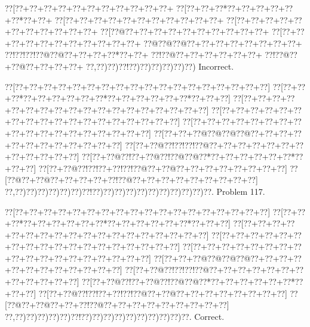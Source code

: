 \documentclass[a5paper]{article}
\begin{document}
\begin{center}
{\goo
\0??[\0??+\0??+\0??+\0??+\0??+\0??+\0??+\0??+\0??+\0??+\0??+
\0??[\0??+\0??+\0??*\0??+\0??+\0??+\0??+\0??+\0??*\0??+\0??+
\0??[\0??+\0??+\0??+\0??+\0??+\0??+\0??+\0??+\0??+\0??+\0??+
\0??[\0??+\0??+\0??+\0??+\0??+\0??+\0??+\0??+\0??+\0??+\0??+
\0??[\0??@\0??+\0??+\0??+\0??+\0??+\0??+\0??+\0??+\0??+\0??+
\0??[\0??+\0??+\0??+\0??+\0??+\0??+\0??+\0??+\0??+\0??+\0??+
\0??@\0??@\0??@\0??+\0??+\0??+\0??+\0??+\0??+\0??+\0??+
\0??!\0??!\0??!\0??@\0??@\0??+\0??+\0??+\0??*\0??+\0??+
\0??!\0??@\0??+\0??+\0??+\0??+\0??+\0??+
\0??!\0??@\0??+\0??@\0??+\0??+\0??+\0??+
\0??,\0??)\0??)\0??!\0??)\0??)\0??)\0??)\0??)\0??)
}
Incorrect. 

\end{center}
\newpage
\begin{center}
{\goo
\0??[\0??+\0??+\0??+\0??+\0??+\0??+\0??+\0??+\0??+\0??+\0??+\0??+\0??+\0??+\0??+\0??+\0??+\0??]
\0??[\0??+\0??+\0??*\0??+\0??+\0??+\0??+\0??+\0??*\0??+\0??+\0??+\0??+\0??+\0??*\0??+\0??+\0??]
\0??[\0??+\0??+\0??+\0??+\0??+\0??+\0??+\0??+\0??+\0??+\0??+\0??+\0??+\0??+\0??+\0??+\0??+\0??]
\0??[\0??+\0??+\0??+\0??+\0??+\0??+\0??+\0??+\0??+\0??+\0??+\0??+\0??+\0??+\0??+\0??+\0??+\0??]
\0??[\0??+\0??+\0??+\0??+\0??+\0??+\0??+\0??+\0??+\0??+\0??+\0??+\0??+\0??+\0??+\0??+\0??+\0??]
\0??[\0??+\0??+\0??@\0??@\0??@\0??@\0??+\0??+\0??+\0??+\0??+\0??+\0??+\0??+\0??+\0??+\0??+\0??]
\0??[\0??+\0??@\0??!\0??!\0??!\0??@\0??+\0??+\0??+\0??+\0??+\0??+\0??+\0??+\0??+\0??+\0??+\0??]
\0??[\0??+\0??@\0??!\0??+\0??@\0??!\0??@\0??@\0??*\0??+\0??+\0??+\0??+\0??+\0??*\0??+\0??+\0??]
\0??[\0??+\0??@\0??!\0??!\0??+\0??!\0??!\0??@\0??+\0??@\0??+\0??+\0??+\0??+\0??+\0??+\0??+\0??]
\0??[\0??@\0??+\0??@\0??+\0??+\0??+\0??+\0??!\0??@\0??+\0??+\0??+\0??+\0??+\0??+\0??+\0??+\0??]
\0??,\0??)\0??)\0??)\0??)\0??)\0??)\0??!\0??)\0??)\0??)\0??)\0??)\0??)\0??)\0??)\0??)\0??)\0??.
}
Problem 117.

\end{center}
\begin{center}
{\goo
\0??[\0??+\0??+\0??+\0??+\0??+\0??+\0??+\0??+\0??+\0??+\0??+\0??+\0??+\0??+\0??+\0??+\0??+\0??]
\0??[\0??+\0??+\0??*\0??+\0??+\0??+\0??+\0??+\0??*\0??+\0??+\0??+\0??+\0??+\0??*\0??+\0??+\0??]
\0??[\0??+\0??+\0??+\0??+\0??+\0??+\0??+\0??+\0??+\0??+\0??+\0??+\0??+\0??+\0??+\0??+\0??+\0??]
\0??[\0??+\0??+\0??+\0??+\0??+\0??+\0??+\0??+\0??+\0??+\0??+\0??+\0??+\0??+\0??+\0??+\0??+\0??]
\0??[\0??+\0??+\0??+\0??+\0??+\0??+\0??+\0??+\0??+\0??+\0??+\0??+\0??+\0??+\0??+\0??+\0??+\0??]
\0??[\0??+\0??+\0??@\0??@\0??@\0??@\0??+\0??+\0??+\0??+\0??+\0??+\0??+\0??+\0??+\0??+\0??+\0??]
\0??[\0??+\0??@\0??!\0??!\0??!\0??@\0??+\0??+\0??+\0??+\0??+\0??+\0??+\0??+\0??+\0??+\0??+\0??]
\0??[\0??+\0??@\0??!\0??+\0??@\0??!\0??@\0??@\0??*\0??+\0??+\0??+\0??+\0??+\0??*\0??+\0??+\0??]
\0??[\0??+\0??@\0??!\0??!\0??+\0??!\0??!\0??@\0??+\0??@\0??+\0??+\0??+\0??+\0??+\0??+\0??+\0??]
\0??[\0??@\0??+\0??@\0??+\0??+\0??!\0??@\0??+\0??+\0??+\0??+\0??+\0??+\0??+\0??+\0??]
\0??,\0??)\0??)\0??)\0??)\0??)\0??!\0??)\0??)\0??)\0??)\0??)\0??)\0??)\0??)\0??)\0??.
}
Correct. 

\end{center}
\end{document}
